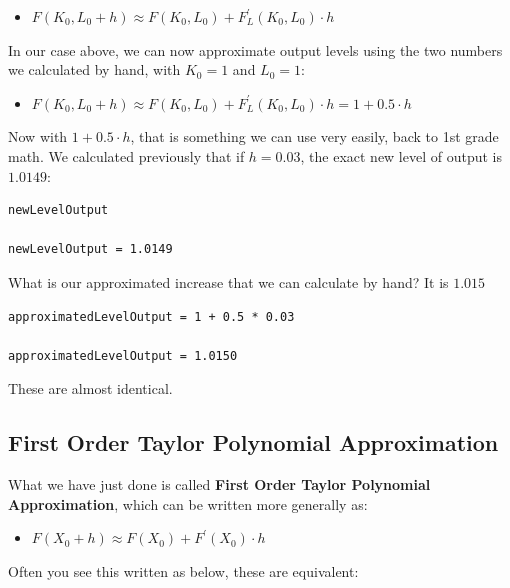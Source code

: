\documentclass[
]{book}
\providecommand{\tightlist}{%
  \setlength{\itemsep}{0pt}\setlength{\parskip}{0pt}}
\begin{document}
\begin{itemize}
\tightlist
\item
  \(\displaystyle F(K_0 ,L_0 +h)\approx F(K_0 ,L_0 )+F_L^{\prime } (K_0 ,L_0 )\cdot h\)
\end{itemize}

In our case above, we can now approximate output levels using the two
numbers we calculated by hand, with \(K_0 =1\) and \(L_0 =1\):

\begin{itemize}
\tightlist
\item
  \(\displaystyle F(K_0 ,L_0 +h)\approx F(K_0 ,L_0 )+F_L^{\prime } (K_0 ,L_0 )\cdot h=1+0.5\cdot h\)
\end{itemize}

Now with \({{1+0.5\cdot h}}\), that is something we can use very easily,
back to 1st grade math. We calculated previously that if \(h=0.03\), the
exact new level of output is \(1.0149\):

\begin{verbatim}
newLevelOutput

newLevelOutput = 1.0149
\end{verbatim}

What is our approximated increase that we can calculate by hand? It is
\(1.015\)

\begin{verbatim}
approximatedLevelOutput = 1 + 0.5 * 0.03

approximatedLevelOutput = 1.0150
\end{verbatim}

These are almost identical.

\hypertarget{first-order-taylor-polynomial-approximation}{%
\subsection{First Order Taylor Polynomial Approximation}\label{first-order-taylor-polynomial-approximation}}

What we have just done is called \textbf{First Order Taylor Polynomial
Approximation}, which can be written more generally as:

\begin{itemize}
\tightlist
\item
  \(\displaystyle F(X_0 +h)\approx F(X_0 )+F^{\prime } (X_0 )\cdot h\)
\end{itemize}

Often you see this written as below, these are equivalent:
\end{document}
